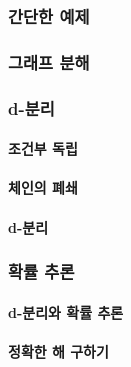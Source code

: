 \documentclass [12pt] {oblivoir}
\let\oldsubsubsection=\subsubsection
\renewcommand{\subsubsection}
{
  \filbreak
  \oldsubsubsection
}
\begin{document}
\vspace{3mm}

\subsubsection{간단한 예제}

\subsubsection{그래프 분해}

\subsubsection{d-분리}

\paragraph*{조건부 독립}\mbox{}

\vspace{3mm}

\paragraph*{체인의 폐쇄}\mbox{}

\vspace{3mm}

\paragraph*{d-분리}\mbox{}

\vspace{3mm}

\subsubsection{확률 추론}

\paragraph*{d-분리와 확률 추론}\mbox{}

\vspace{3mm}

\paragraph*{정확한 해 구하기}\mbox{}

\vspace{3mm}
\end{document}
